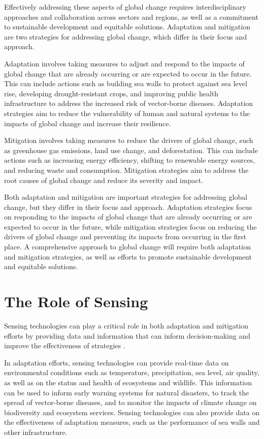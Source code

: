 Effectively addressing these aspects of global change requires interdisciplinary approaches and collaboration across sectors and regions, as well as a commitment to sustainable development and equitable solutions. Adaptation and mitigation are two strategies for addressing global change, which differ in their focus and approach.

Adaptation involves taking measures to adjust and respond to the impacts of global change that are already occurring or are expected to occur in the future. This can include actions such as building sea walls to protect against sea level rise, developing drought-resistant crops, and improving public health infrastructure to address the increased risk of vector-borne diseases. Adaptation strategies aim to reduce the vulnerability of human and natural systems to the impacts of global change and increase their resilience.

Mitigation involves taking measures to reduce the drivers of global change, such as greenhouse gas emissions, land use change, and deforestation. This can include actions such as increasing energy efficiency, shifting to renewable energy sources, and reducing waste and consumption. Mitigation strategies aim to address the root causes of global change and reduce its severity and impact.

Both adaptation and mitigation are important strategies for addressing global change, but they differ in their focus and approach. Adaptation strategies focus on responding to the impacts of global change that are already occurring or are expected to occur in the future, while mitigation strategies focus on reducing the drivers of global change and preventing its impacts from occurring in the first place. A comprehensive approach to global change will require both adaptation and mitigation strategies, as well as efforts to promote sustainable development and equitable solutions.




\section{The Role of Sensing}

Sensing technologies can play a critical role in both adaptation and mitigation efforts by providing data and information that can inform decision-making and improve the effectiveness of strategies \cite{UNEP2017, NRC2010, CEN2017}.

In adaptation efforts, sensing technologies can provide real-time data on environmental conditions such as temperature, precipitation, sea level, air quality, as well as on the status and health of ecosystems and wildlife. This information can be used to inform early warning systems for natural disasters, to track the spread of vector-borne diseases, and to monitor the impacts of climate change on biodiversity and ecosystem services. Sensing technologies can also provide data on the effectiveness of adaptation measures, such as the performance of sea walls and other infrastructure.


